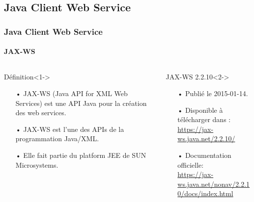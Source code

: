 \subsection{Java Client Web Service}
\begin{frame}
\frametitle{Java Client Web Service}
\framesubtitle{JAX-WS }
\transwipe[duration=2]
\begin{columns}
\begin{column}{8cm}
\begin{block}{Définition}<1->
\begin{itemize}
\item[•] \textcolor{deepblue}{JAX-WS} (\textcolor{colname}{Java} API for \textcolor{colname}{XML} Web Services) est une API \textcolor{colname}{Java} pour la création des web services.
\item[•] \textcolor{deepblue}{JAX-WS} est l'une des APIs de la programmation \textcolor{colname}{Java/XML}.
\item[•] Elle fait partie du platform \textcolor{colname}{JEE} de SUN Microsystems.
\end{itemize}
\end{block}
\end{column}
\begin{column}{8cm}
\begin{block}{JAX-WS 2.2.10}<2->
\vspace*{0.1cm}
\begin{itemize}
\item[•] Publié le 2015-01-14.\\
\item[•] Disponible à télécharger dans :\\
\textcolor{urlcolor}{\url{https://jax-ws.java.net/2.2.10/}}\\
\item[•] Documentation officielle:\\
\textcolor{urlcolor}{\url{https://jax-ws.java.net/nonav/2.2.10/docs/index.html}}
\end{itemize}
\vspace*{0.2cm}
\end{block}
\end{column}
\end{columns}

\end{frame}